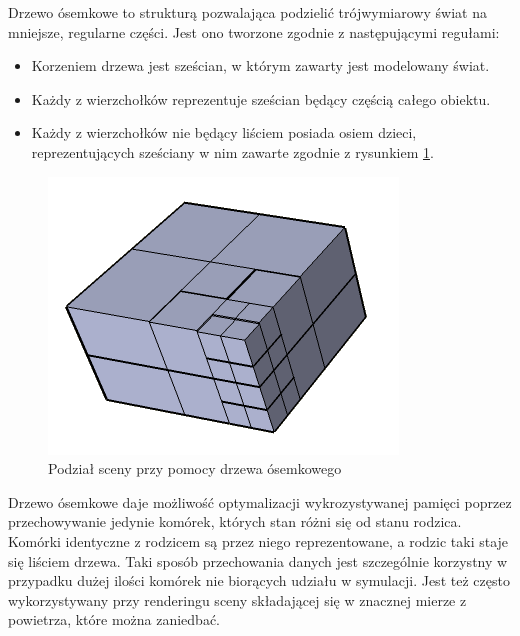 Drzewo ósemkowe to strukturą pozwalająca podzielić trójwymiarowy świat na mniejsze, regularne części. Jest ono tworzone zgodnie z następującymi regułami:
\begin{itemize}
\item Korzeniem drzewa jest sześcian, w którym zawarty jest modelowany świat.
\item Każdy z wierzchołków reprezentuje sześcian będący częścią całego obiektu. 
\item Każdy z wierzchołków nie będący liściem posiada osiem dzieci, reprezentujących sześciany w nim zawarte zgodnie z rysunkiem \ref{drzewo_osemkowe}.
\end{itemize}
\begin{figure}
\begin {center}
\includegraphics[scale=0.5]{drzewo_osemkowe.png} 
\caption {Podział sceny przy pomocy drzewa ósemkowego}
\label {drzewo_osemkowe}
\end {center}
\end{figure}
Drzewo ósemkowe daje możliwość optymalizacji wykrozystywanej pamięci poprzez przechowywanie jedynie komórek, których stan różni się od stanu rodzica. Komórki identyczne z rodzicem są przez niego reprezentowane, a rodzic taki staje się liściem drzewa. 
Taki sposób przechowania danych jest szczególnie korzystny w przypadku dużej ilości komórek nie biorących udziału w symulacji.
Jest też często wykorzystywany przy renderingu sceny składającej się w znacznej mierze z powietrza, które można zaniedbać.

